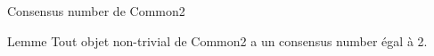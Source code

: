 
\begingroup

\begin{frame}[fragile]{Consensus number de Common2}
  \begin{block}{Lemme}
    Tout objet non-trivial de Common2 a un consensus number égal à 2.
  \end{block}
\end{frame}

\endgroup
\endinput
